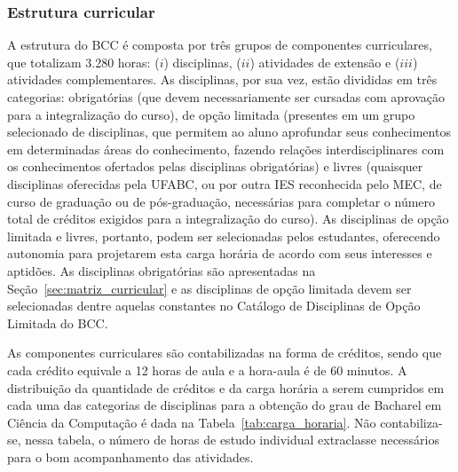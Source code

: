 \subsubsection{Estrutura curricular}

A estrutura do BCC é composta por três grupos de componentes curriculares, que
totalizam 3.280 horas: ($i$) disciplinas, ($ii$) atividades de extensão e
($iii$) atividades complementares.
As disciplinas, por sua vez, estão divididas em três categorias: obrigatórias
(que devem necessariamente ser cursadas com aprovação para a integralização do
curso), de opção limitada (presentes em um grupo selecionado de disciplinas,
que permitem ao aluno aprofundar seus conhecimentos em determinadas áreas do
conhecimento, fazendo relações interdisciplinares com os conhecimentos
ofertados pelas disciplinas obrigatórias) e livres (quaisquer disciplinas
oferecidas pela UFABC, ou por outra IES reconhecida pelo MEC, de curso de
graduação ou de pós-graduação, necessárias para completar o número total de
créditos exigidos para a integralização do curso).
As disciplinas de opção limitada e livres, portanto, podem ser selecionadas
pelos estudantes, oferecendo autonomia para projetarem esta carga horária de
acordo com seus interesses e aptidões.
As disciplinas obrigatórias são apresentadas na
Seção~\ref{sec:matriz_curricular} e as disciplinas de opção limitada devem ser
selecionadas dentre aquelas constantes no Catálogo de Disciplinas de Opção
Limitada do BCC.

As componentes curriculares são contabilizadas na forma de créditos, sendo que
cada crédito equivale a 12 horas de aula e a hora-aula é de 60 minutos.
A distribuição da quantidade de créditos e da carga horária a serem cumpridos
em cada uma das categorias de disciplinas para a obtenção do grau de Bacharel
em Ciência da Computação é dada na Tabela~\ref{tab:carga_horaria}.
Não contabiliza-se, nessa tabela, o número de horas de estudo individual
extraclasse necessários para o bom acompanhamento das atividades.

